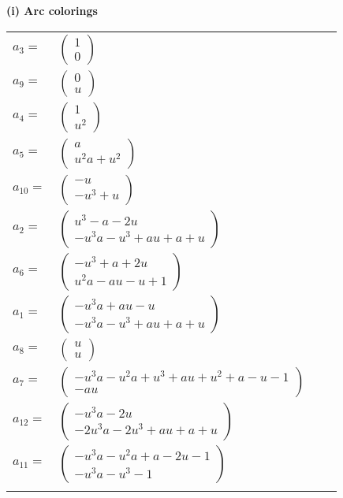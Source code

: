 \documentclass[1p]{elsarticle_modified}
\theoremstyle{definition}
\begin{document}
\flushleft \textbf{(i) Arc colorings}\\
\begin{tabular}{m{7pt} m{180pt} m{7pt} m{180pt} }
\flushright $a_{3}=$&$\begin{pmatrix}1\\0\end{pmatrix}$ \\
\flushright $a_{9}=$&$\begin{pmatrix}0\\u\end{pmatrix}$ \\
\flushright $a_{4}=$&$\begin{pmatrix}1\\u^2\end{pmatrix}$ \\
\flushright $a_{5}=$&$\begin{pmatrix}a\\u^2 a+u^2\end{pmatrix}$ \\
\flushright $a_{10}=$&$\begin{pmatrix}- u\\- u^3+u\end{pmatrix}$ \\
\flushright $a_{2}=$&$\begin{pmatrix}u^3- a-2 u\\- u^3 a- u^3+a u+a+u\end{pmatrix}$ \\
\flushright $a_{6}=$&$\begin{pmatrix}- u^3+a+2 u\\u^2 a- a u- u+1\end{pmatrix}$ \\
\flushright $a_{1}=$&$\begin{pmatrix}- u^3 a+a u- u\\- u^3 a- u^3+a u+a+u\end{pmatrix}$ \\
\flushright $a_{8}=$&$\begin{pmatrix}u\\u\end{pmatrix}$ \\
\flushright $a_{7}=$&$\begin{pmatrix}- u^3 a- u^2 a+u^3+a u+u^2+a- u-1\\- a u\end{pmatrix}$ \\
\flushright $a_{12}=$&$\begin{pmatrix}- u^3 a-2 u\\-2 u^3 a-2 u^3+a u+a+u\end{pmatrix}$ \\
\flushright $a_{11}=$&$\begin{pmatrix}- u^3 a- u^2 a+a-2 u-1\\- u^3 a- u^3-1\end{pmatrix}$\\&\end{tabular}
\end{document}
